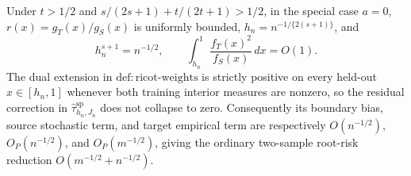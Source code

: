 Under \(t>1/2\) and \(s/(2s+1)+t/(2t+1)>1/2\), in the special case \(a=0\), \(r(x)=g_T(x)/g_S(x)\) is uniformly bounded, \(h_n=n^{-1/\{2(s+1)\}}\), and \[h_n^{s+1}=n^{-1/2},\qquad \int_{h_n}^1\frac{f_T(x)^2}{f_S(x)}\,dx=O(1).\] The dual extension in \(\mathrm{def:ricot\text{-}weights}\) is strictly positive on every held-out \(x\in[h_n,1]\) whenever both training interior measures are nonzero, so the residual correction in \(\widehat\tau^{\mathrm{sp}}_{h_n,J_n}\) does not collapse to zero. Consequently its boundary bias, source stochastic term, and target empirical term are respectively \(O(n^{-1/2})\), \(O_P(n^{-1/2})\), and \(O_P(m^{-1/2})\), giving the ordinary two-sample root-risk reduction \(O(m^{-1/2}+n^{-1/2})\).